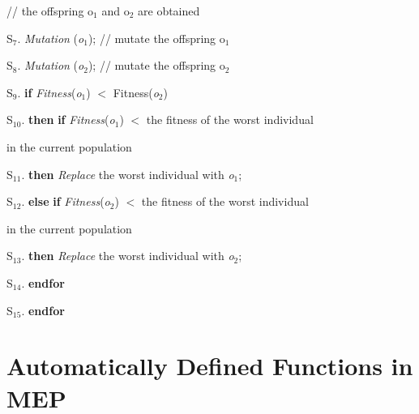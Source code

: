 \documentclass [11pt]{article}
\begin{document}
\hspace{4cm}\textsf{// the offspring o}$_{1}$\textsf{ and o}$_{2}$\textsf{ are obtained}

\textsf{S}$_{7}$\textsf{. }\hspace{1cm}\textsf{\textit{Mutation}}\textsf{ 
(}\textsf{\textit{o}}$_{1}$\textsf{); // mutate the offspring o}$_{1}$

\textsf{S}$_{8}$\textsf{. }\hspace{1cm}\textsf{\textit{Mutation}}\textsf{ 
(}\textsf{\textit{o}}$_{2}$\textsf{); // mutate the offspring o}$_{2}$

\textsf{S}$_{9}$\textsf{. }\hspace{1cm}\textsf{\textbf{if}}\textsf{ 
}\textsf{\textit{Fitness}}\textsf{(}\textsf{\textit{o}}$_{1}$\textsf{) $<$ 
Fitness(}\textsf{\textit{o}}$_{2}$\textsf{)}

\textsf{S}$_{10}$\textsf{. }\hspace{1cm}\textsf{\textbf{then}}\textsf{ 
}\textsf{\textbf{if}}\textsf{ 
}\textsf{\textit{Fitness}}\textsf{(}\textsf{\textit{o}}$_{1}$\textsf{) $<$ the 
fitness of the worst individual}

\hspace{5cm}\textsf{in the current population}

\textsf{S}$_{11}$\textsf{. }\hspace{1cm}\textsf{\textbf{then}}\textsf{ 
}\textsf{\textit{Replace}}\textsf{ the worst individual with 
}\textsf{\textit{o}}$_{1}$\textsf{;}

\textsf{S}$_{12}$\textsf{. }\hspace{1cm}\textsf{\textbf{else}}\textsf{ 
}\textsf{\textbf{if}}\textsf{ 
}\textsf{\textit{Fitness}}\textsf{(}\textsf{\textit{o}}$_{2}$\textsf{) $<$ the 
fitness of the worst individual}

\hspace{5cm}\textsf{in the current population}

\textsf{S}$_{13}$\textsf{. }\hspace{1cm}\textsf{\textbf{then}}\textsf{ 
}\textsf{\textit{Replace}}\textsf{ the worst individual with 
}\textsf{\textit{o}}$_{2}$\textsf{;}

\textsf{S}$_{14}$\textsf{. }\hspace{1cm}\textsf{\textbf{endfor}}

\textsf{S}$_{15}$\textsf{. }\textsf{\textbf{endfor }}


\section{Automatically Defined Functions in MEP}
\label{mep_adfs}
\end{document}
